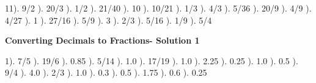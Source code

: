 \documentclass{article}%
\begin{document}
11). 9/2%
). 20/3%
). 1/2%
). 21/40%
). 10%
). 10/21%
). 1/3%
). 4/3%
). 5/36%
). 20/9%
). 4/9%
). 4/27%
). 1%
). 27/16%
). 5/9%
). 3%
). 2/3%
). 5/16%
). 1/9%
). 5/4%
\newline%
\newpage%
\large%
\begin{center}%
\textbf{Converting Decimals to Fractions- Solution 1}%
\newline%
\end{center} \normalsize%
1). 7/5%
). 19/6%
). 0.85%
). 5/14%
). 1.0%
). 17/19%
). 1.0%
). 2.25%
). 0.25%
). 1.0%
). 0.5%
). 9/4%
). 4.0%
). 2/3%
). 1.0%
). 0.3%
). 0.5%
). 1.75%
). 0.6%
). 0.25%
\end{document}
